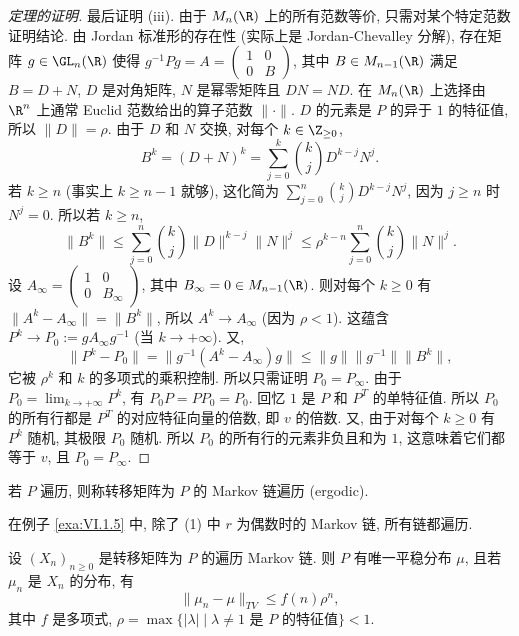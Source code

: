 \begin{proof}[定理的证明]
最后证明 (iii). 由于 $M_n(\R)$ 上的所有范数等价, 只需对某个特定范数证明结论. 由 Jordan 标准形的存在性 (实际上是 Jordan-Chevalley 分解), 存在矩阵 $g \in \GL_n(\R)$ 使得 $g^{-1}Pg = A = \begin{pmatrix} 1 & 0 \\ 0 & B \end{pmatrix}$, 其中 $B \in M_{n-1}(\R)$ 满足 $B = D + N$, $D$ 是对角矩阵, $N$ 是幂零矩阵且 $DN = ND$. 在 $M_n(\R)$ 上选择由 $\R^n$ 上通常 Euclid 范数给出的算子范数 $\|\cdot\|$. $D$ 的元素是 $P$ 的异于 $1$ 的特征值, 所以 $\|D\| = \rho$. 由于 $D$ 和 $N$ 交换, 对每个 $k \in \Z_{\geq 0}$,
\[
B^k = (D + N)^k = \sum_{j=0}^k\binom{k}{j}D^{k-j}N^j.
\]
若 $k \geq n$ (事实上 $k \geq n - 1$ 就够), 这化简为 $\sum_{j=0}^n\binom{k}{j}D^{k-j}N^j$, 因为 $j \geq n$ 时 $N^j = 0$. 所以若 $k \geq n$,
\[
\|B^k\| \leq \sum_{j=0}^n\binom{k}{j}\|D\|^{k-j}\|N\|^j \leq \rho^{k-n}\sum_{j=0}^n\binom{k}{j}\|N\|^j.
\]
设 $A_{\infty} = \begin{pmatrix} 1 & 0 \\ 0 & B_{\infty} \end{pmatrix}$, 其中 $B_{\infty} = 0 \in M_{n-1}(\R)$. 则对每个 $k \geq 0$ 有 $\|A^k - A_{\infty}\| = \|B^k\|$, 所以 $A^k \to A_{\infty}$ (因为 $\rho < 1$). 这蕴含 $P^k \to P_0 := gA_{\infty}g^{-1}$ (当 $k \to +\infty$). 又,
\[
\|P^k - P_0\| = \|g^{-1}(A^k - A_{\infty})g\| \leq \|g\|\|g^{-1}\|\|B^k\|,
\]
它被 $\rho^k$ 和 $k$ 的多项式的乘积控制. 所以只需证明 $P_0 = P_{\infty}$. 由于 $P_0 = \lim_{k \to +\infty}P^k$, 有 $P_0P = PP_0 = P_0$. 回忆 $1$ 是 $P$ 和 $P^T$ 的单特征值. 所以 $P_0$ 的所有行都是 $P^T$ 的对应特征向量的倍数, 即 $v$ 的倍数. 又, 由于对每个 $k \geq 0$ 有 $P^k$ 随机, 其极限 $P_0$ 随机. 所以 $P_0$ 的所有行的元素非负且和为 $1$, 这意味着它们都等于 $v$, 且 $P_0 = P_{\infty}$.
\end{proof}

\begin{definition}
\label{def:VI.2.6}
若 $P$ 遍历, 则称转移矩阵为 $P$ 的 Markov 链遍历 (ergodic).
\end{definition}

在例子 \ref{exa:VI.1.5} 中, 除了 (1) 中 $r$ 为偶数时的 Markov 链, 所有链都遍历.

\begin{corollary}[遍历链的收敛]
\label{cor:VI.2.7}
设 $(X_n)_{n \geq 0}$ 是转移矩阵为 $P$ 的遍历 Markov 链. 则 $P$ 有唯一平稳分布 $\mu$, 且若 $\mu_n$ 是 $X_n$ 的分布, 有
\[
\|\mu_n - \mu\|_{TV} \leq f(n)\rho^n,
\]
其中 $f$ 是多项式, $\rho = \max\{|\lambda| \mid \lambda \neq 1 \text{ 是 } P \text{ 的特征值}\} < 1$.
\end{corollary}


